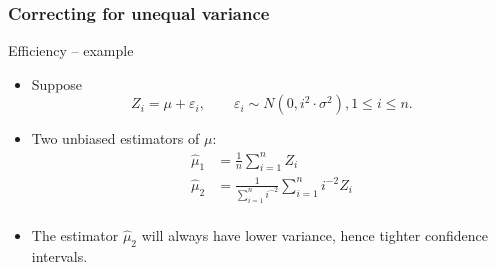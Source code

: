 \documentclass[handout]{beamer}
\begin{document}

   \begin{frame} \frametitle{Correcting for unequal variance}

   \begin{block}
   {Efficiency -- example}
   \begin{itemize}
   \item Suppose
   $$
   Z_i = \mu + \varepsilon_i, \qquad \varepsilon_i \sim N(0, i^2 \cdot \sigma^2), 1 \leq i \leq n.$$

   \item Two unbiased estimators of $\mu$:
   $$
   \begin{aligned}
   \widehat{\mu}_1 &= \frac{1}{n}\sum_{i=1}^n Z_i \\
   \widehat{\mu}_2 &= \frac{1}{\sum_{i=1}^n i^{-2}}\sum_{i=1}^n i^{-2}Z_i \\
   \end{aligned}
   $$

   \item The estimator $\widehat{\mu}_2$ will always have lower variance, hence tighter confidence intervals.

   \end{itemize}
   \end{block}
   \end{frame}

\end{document}
